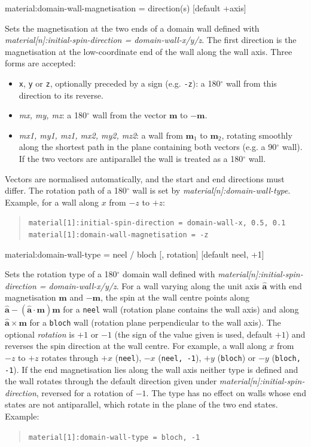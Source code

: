 {\zicf material:domain-wall-magnetisation = direction(s) [default +axis]} Sets the magnetisation at the two ends of a domain wall defined with \textit{material[n]:initial-spin-direction = domain-wall-x/y/z}. The first direction is the magnetisation at the low-coordinate end of the wall along the wall axis. Three forms are accepted:
\begin{itemize}
  \item[] \texttt{x}, \texttt{y} or \texttt{z}, optionally preceded by a sign (e.g. \texttt{-z}): a 180$^\circ$ wall from this direction to its reverse.
  \item[] \emph{mx, my, mz}: a 180$^\circ$ wall from the vector $\mathbf{m}$ to $-\mathbf{m}$.
  \item[] \emph{mx1, my1, mz1, mx2, my2, mz2}: a wall from $\mathbf{m}_1$ to $\mathbf{m}_2$, rotating smoothly along the shortest path in the plane containing both vectors (e.g. a 90$^\circ$ wall). If the two vectors are antiparallel the wall is treated as a 180$^\circ$ wall.
\end{itemize}
Vectors are normalised automatically, and the start and end directions must differ. The rotation path of a 180$^\circ$ wall is set by \textit{material[n]:domain-wall-type}. Example, for a wall along $x$ from $-z$ to $+z$:
\begin{quote}
\verb|material[1]:initial-spin-direction = domain-wall-x, 0.5, 0.1| \\
\verb|material[1]:domain-wall-magnetisation = -z|
\end{quote}

{\zicf material:domain-wall-type = neel / bloch [, rotation] [default neel, +1]} Sets the rotation type of a 180$^\circ$ domain wall defined with \textit{material[n]:initial-spin-direction = domain-wall-x/y/z}. For a wall varying along the unit axis $\hat{\mathbf{a}}$ with end magnetisation $\mathbf{m}$ and $-\mathbf{m}$, the spin at the wall centre points along $\hat{\mathbf{a}} - (\hat{\mathbf{a}}\cdot\mathbf{m})\mathbf{m}$ for a \texttt{neel} wall (rotation plane contains the wall axis) and along $\hat{\mathbf{a}}\times\mathbf{m}$ for a \texttt{bloch} wall (rotation plane perpendicular to the wall axis). The optional \emph{rotation} is $+1$ or $-1$ (the sign of the value given is used, default $+1$) and reverses the spin direction at the wall centre. For example, a wall along $x$ from $-z$ to $+z$ rotates through $+x$ (\texttt{neel}), $-x$ (\texttt{neel, -1}), $+y$ (\texttt{bloch}) or $-y$ (\texttt{bloch, -1}). If the end magnetisation lies along the wall axis neither type is defined and the wall rotates through the default direction given under \textit{material[n]:initial-spin-direction}, reversed for a rotation of $-1$. The type has no effect on walls whose end states are not antiparallel, which rotate in the plane of the two end states. Example:
\begin{quote}
\verb|material[1]:domain-wall-type = bloch, -1|
\end{quote}

